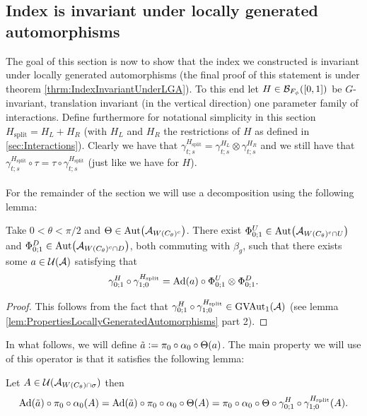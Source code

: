 \documentclass[12pt,a4paper,twoside]{article}
\numberwithin{equation}{section}
\begin{document}
\subsection{Index is invariant under locally generated automorphisms}\label{sec:IndexInvariantUnderLGA}
The goal of this section is now to show that the index we constructed is invariant under locally generated automorphisms (the final proof of this statement is under theorem \ref{thrm:IndexInvariantUnderLGA}). To this end let $H\in\BB_{F_\phi}([0,1])$ be $G$-invariant, translation invariant (in the vertical direction) one parameter family of interactions. Define furthermore for notational simplicity in this section $H_{\text{split}}=H_L+H_R$ (with $H_L$ and $H_R$ the restrictions of $H$ as defined in \ref{sec:Interactions}). Clearly we have that $\gamma^{H_{\text{split}}}_{t;s}=\gamma^{H_L}_{t;s}\otimes\gamma^{H_R}_{t;s}$ and we still have that $\gamma^{H_{\text{split}}}_{t;s}\circ\tau=\tau\circ\gamma^{H_{\text{split}}}_{t;s}$ (just like we have for $H$).\\\\
For the remainder of the section we will use a decomposition using the following lemma:
\begin{lemma}\label{lem:DefinitionOfGroupMorphismVAutEquation}
	Take $0<\theta<\pi/2$ and $\Theta\in \Aut{\AA_{W(C_\theta)^c}}$. There exist $\Phi^U_{0;1}\in\Aut{\AA_{W(C_\theta)^c\cap U}}$ and $\Phi^D_{0;1}\in\Aut{\AA_{W(C_\theta)^c\cap D}}$, both commuting with $\beta_g$, such that there exists some $a\in\UU(\AA)$ satisfying that
	\begin{equation}\label{eq:DefinitionOfGroupMorphismVAutEquation}
	\gamma^H_{0;1}\circ\gamma^{H_\text{split}}_{1;0}=\Ad{a}\circ \Phi^U_{0;1}\otimes\Phi^D_{0;1}.
	\end{equation}
\end{lemma}
\begin{proof}
	This follows from the fact that $\gamma^H_{0;1}\circ\gamma^{H_\text{split}}_{1;0}\in \textrm{GVAut}_1(\AA)$ (see lemma \ref{lem:PropertiesLocallyGeneratedAutomorphisms} part 2).
\end{proof}
In what follows, we will define $\tilde{a}\defeq \pi_0\circ\alpha_0\circ\Theta(a)$. The main property we will use of this operator is that it satisfies the following lemma:
\begin{lemma}\label{lem:PropertyTilde_a}
	Let $A\in\UU(\AA_{W(C_\theta)\cap\sigma})$ then
	\begin{equation}
		\Ad{\tilde{a}}\circ\pi_0\circ\alpha_0(A)=\Ad{\tilde{a}}\circ\pi_0\circ\alpha_0\circ\Theta(A)=\pi_0\circ\alpha_0\circ\Theta\circ\gamma^H_{0;1}\circ\gamma^{H_{\text{split}}}_{1;0}(A).
	\end{equation}
\end{lemma}
\end{document}
